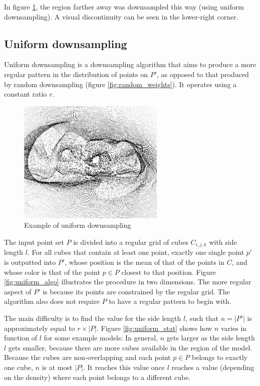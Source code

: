 \documentclass[a4paper,10pt,abstracton,notitlepage]{scrreprt}
\begin{document}
In figure \ref{fig:uniform_example}, the region farther away was downsampled this way (using uniform downsampling). A visual discontinuity can be seen in the lower-right corner.

\subsection{Uniform downsampling}
Uniform downsampling is a downsampling algorithm that aims to produce a more regular pattern in the distribution of points on $P'$, as opposed to that produced by random downsampling (figure \ref{fig:random_weights}). It operates using a constant ratio $r$.

\begin{figure}
\includegraphics[width=7cm,frame]{uniform_example_inv.png}
\caption{Example of uniform downsampling}
\label{fig:uniform_example}
\end{figure}
The input point set $P$ is divided into a regular grid of cubes $C_{i,j,k}$ with side length $l$. For all cubes that contain at least one point, exactly one single point $p'$ is outputted into $P'$, whose position is the mean of that of the points in $C$, and whose color is that of the point $p \in P$ closest to that position. Figure \ref{fig:uniform_algo} illustrates the procedure in two dimensions. The more regular aspect of $P'$ is because its points are constrained by the regular grid. The algorithm also does not require $P$ to have a regular pattern to begin with.

The main difficulty is to find the value for the side length $l$, such that $n = |P'|$ is approximately equal to $r \times |P|$. Figure \ref{fig:uniform_stat} shows how $n$ varies in function of $l$ for some example models: In general, $n$ gets larger as the side length $l$ gets smaller, because there are more cubes available in the region of the model. Because the cubes are non-overlapping and each point $p \in P$ belongs to exactly one cube, $n$ is at most $|P|$. It reaches this value once $l$ reaches a value (depending on the density) where each point belongs to a different cube.
\end{document}
